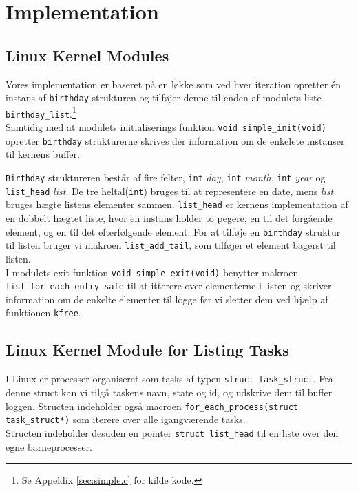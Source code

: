 \documentclass[main.tex]{subfile}
\begin{document}
\section{Implementation}
\subsection{Linux Kernel Modules}
Vores implementation er baseret på en løkke som ved hver iteration opretter én instans af \texttt{birthday} strukturen og tilføjer denne til enden af modulets liste \texttt{birthday\_list}.\footnote{Se Appeldix \ref{sec:simple.c} for kilde kode.}\\

Samtidig med at modulets initialiserings funktion \texttt{void simple\_init(void)} opretter \texttt{birthday} strukturerne skrives der information om de enkelete instanser til kernens buffer. 

\texttt{Birthday} struktureren består af fire felter, \texttt{int} \emph{day}, \texttt{int} \emph{month}, \texttt{int} \emph{year} og \texttt{list\_head} \emph{list}. De tre heltal(\texttt{int}) bruges til at representere en date, mens \emph{list} bruges hægte listens elementer sammen. \texttt{list\_head} er kernens implementation af en dobbelt hægtet liste, hvor en instans holder to pegere, en til det forgående element, og en til det efterfølgende element. For at tilføje en \texttt{birthday} struktur til listen bruger vi makroen \texttt{list\_add\_tail}, som tilføjer et element bagerst til listen.\\

I modulets exit funktion \texttt{void simple\_exit(void)} benytter makroen \texttt{list\_for\_each\_entry\_safe} til at itterere over elementerne i listen og skriver information om de enkelte elementer til logge før vi sletter dem ved hjælp af funktionen \texttt{kfree}. 

\subsection{Linux Kernel Module for Listing Tasks}
I Linux er processer organiseret som tasks af typen \texttt{struct task\_struct}. Fra denne struct kan vi tilgå taskens navn, state og id, og udskrive dem til buffer loggen. Structen indeholder også macroen \texttt{for\_each\_process(struct task\_struct*)} som iterere over alle igangværende tasks.\\

Structen indeholder desuden en pointer \texttt{struct list\_head} til en liste over den egne barneprocesser.\\
\end{document}
